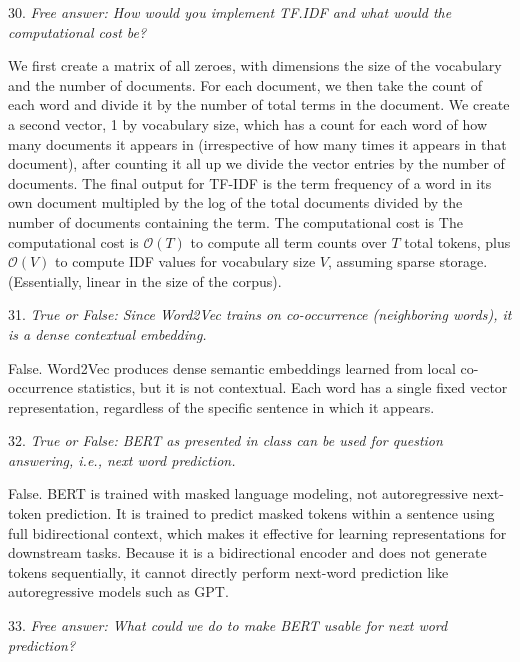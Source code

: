 \vspace{1cm}

30. \textit{Free answer: How would you implement TF.IDF and what would the computational cost be?}

We first create a matrix of all zeroes, with dimensions the size of the vocabulary and the number of documents. For each document, we then take the count of each word and divide it by the number of total terms in the document. We create a second vector, 1 by vocabulary size, which has a count for each word of how many documents it appears in (irrespective of how many times it appears in that document), after counting it all up we divide the vector entries by the number of documents. The final output for TF-IDF is the term frequency of a word in its own document multipled by the log of the total documents divided by the number of documents containing the term. The computational cost is The computational cost is $\mathcal{O}(T)$ to compute all term counts over $T$ total tokens, plus $\mathcal{O}(V)$ to compute IDF values for vocabulary size $V$, assuming sparse storage. (Essentially, linear in the size of the corpus). 

\vspace{1cm}

31. \textit{True or False: Since Word2Vec trains on co-occurrence (neighboring words), it is a dense contextual embedding.}

False. Word2Vec produces dense semantic embeddings learned from local co-occurrence statistics, but it is not contextual. Each word has a single fixed vector representation, regardless of the specific sentence in which it appears.

\vspace{1cm}

32. \textit{True or False: BERT as presented in class can be used for question answering, i.e., next word prediction.}

False. BERT is trained with masked language modeling, not autoregressive next-token prediction. It is trained to predict masked tokens within a sentence using full bidirectional context, which makes it effective for learning representations for downstream tasks. Because it is a bidirectional encoder and does not generate tokens sequentially, it cannot directly perform next-word prediction like autoregressive models such as GPT.

\vspace{1cm}

33. \textit{Free answer: What could we do to make BERT usable for next word prediction?}

